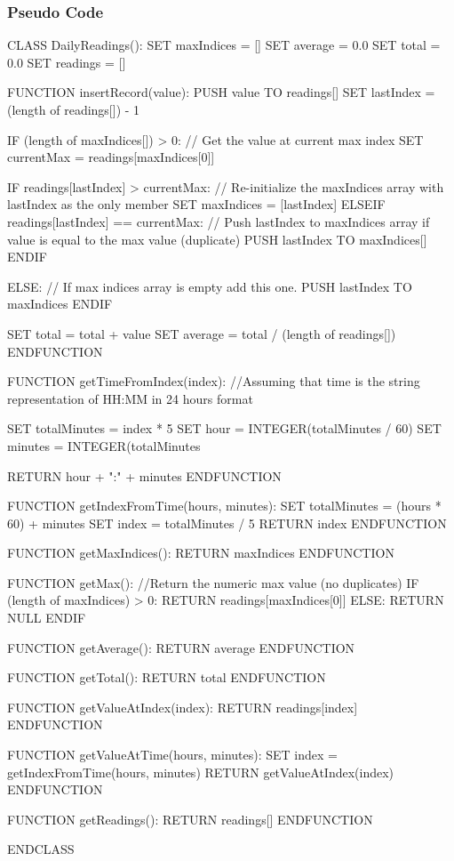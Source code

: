 \documentclass[12pt]{article}
\begin{document}
\subsubsection{Pseudo Code}
\begin{algorithm}[caption={Blueprint of dailyReadings ADT}, label=subalgo2]
	CLASS DailyReadings():
	SET maxIndices = []  
	SET average = 0.0
	SET total = 0.0
	SET readings = []
	
	FUNCTION insertRecord(value):
	PUSH value TO readings[]
	SET lastIndex = (length of readings[]) - 1
	
	IF (length of maxIndices[]) > 0:
	// Get the value at current max index
	SET currentMax = readings[maxIndices[0]]
	
	IF readings[lastIndex] > currentMax:
	// Re-initialize the maxIndices array with lastIndex as the only member
	SET maxIndices = [lastIndex]
	ELSEIF readings[lastIndex] == currentMax:
	// Push lastIndex to maxIndices array if value is equal to the max value (duplicate)
	PUSH lastIndex TO maxIndices[]
	ENDIF
	
	ELSE:
	// If max indices array is empty add this one.
	PUSH lastIndex TO maxIndices
	ENDIF
	
	SET total = total + value
	SET average = total / (length of readings[])
	ENDFUNCTION
	
	FUNCTION getTimeFromIndex(index):
	//Assuming that time is the string representation of HH:MM in 24 hours format
	
	SET totalMinutes = index * 5
	SET hour = INTEGER(totalMinutes / 60)
	SET minutes = INTEGER(totalMinutes %
	
	RETURN hour + ":" + minutes
	ENDFUNCTION
	
	FUNCTION getIndexFromTime(hours, minutes):
	SET totalMinutes = (hours * 60) + minutes
	SET index = totalMinutes / 5
	RETURN index
	ENDFUNCTION
	
	FUNCTION getMaxIndices():
	RETURN maxIndices
	ENDFUNCTION
	
	FUNCTION getMax():
	//Return the numeric max value (no duplicates)
	IF (length of maxIndices) > 0:
	RETURN readings[maxIndices[0]]
	ELSE:
	RETURN NULL
	ENDIF
	
	FUNCTION getAverage():
	RETURN average
	ENDFUNCTION
	
	FUNCTION getTotal():
	RETURN total
	ENDFUNCTION
	
	FUNCTION getValueAtIndex(index):
	RETURN readings[index]
	ENDFUNCTION
	
	FUNCTION getValueAtTime(hours, minutes):
	SET index = getIndexFromTime(hours, minutes)
	RETURN getValueAtIndex(index)
	ENDFUNCTION
	
	FUNCTION getReadings():
	RETURN readings[]
	ENDFUNCTION
	
	ENDCLASS
\end{algorithm}
\end{document}
